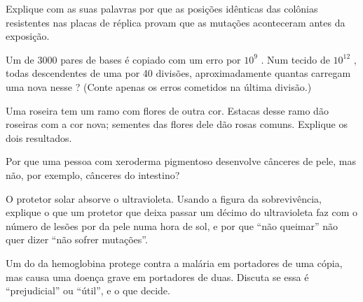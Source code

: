 \begin{exercise}[$\star\star$]\label{exo:g11:mutations:8}
Explique com as suas palavras por que as posições idênticas das
colônias resistentes nas placas de réplica provam que as mutações
aconteceram antes da exposição.
\end{exercise}

\begin{exercise}[$\star\star$]\label{exo:g11:mutations:9}
Um  de \num{3000} pares de bases é copiado com um erro por $10^9$
. Num tecido de $10^{12}$ , todas descendentes de
uma  por 40 divisões, aproximadamente quantas  carregam
uma  nova nesse ? (Conte apenas os erros cometidos na última
divisão.)
\end{exercise}

\begin{exercise}[$\star\star$]\label{exo:g11:mutations:10}
Uma roseira tem um ramo com flores de outra cor. Estacas desse ramo dão
roseiras com a cor nova; sementes das flores dele dão rosas comuns.
Explique os dois resultados.
\end{exercise}

\begin{exercise}[$\star\star$]\label{exo:g11:mutations:11}
Por que uma pessoa com xeroderma pigmentoso desenvolve cânceres de
pele, mas não, por exemplo, cânceres do intestino?
\end{exercise}

\begin{exercise}[$\star\star\star$]\label{exo:g11:mutations:12}
O protetor solar absorve o ultravioleta. Usando a figura da
sobrevivência, explique o que um protetor que deixa passar um décimo do
ultravioleta faz com o número de lesões por  da pele numa hora de
sol, e por que ``não queimar'' não quer dizer ``não sofrer mutações''.
\end{exercise}

\begin{exercise}[$\star\star\star$]\label{exo:g11:mutations:13}
Um  do  da hemoglobina protege contra a malária em portadores
de uma cópia, mas causa uma doença grave em portadores de duas.
Discuta se essa  é ``prejudicial'' ou ``útil'', e o que decide.
\end{exercise}

